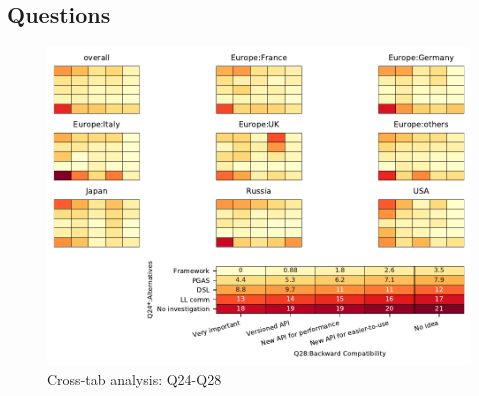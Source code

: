 
\subsection{Questions}


\begin{figure}
\begin{center}
\includegraphics[width=12cm]{../pdfs/Q24-Q28.pdf}
\caption{Cross-tab analysis: Q24-Q28}
\label{fig:Q24-Q28}
\end{center}
\end{figure}
